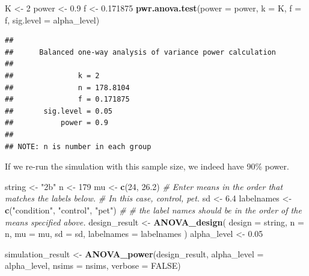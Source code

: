 \documentclass[]{book}
\newenvironment{Shaded}{\begin{snugshade}}{\end{snugshade}}
\newcommand{\CommentTok}[1]{\textcolor[rgb]{0.56,0.35,0.01}{\textit{#1}}}
\newcommand{\DataTypeTok}[1]{\textcolor[rgb]{0.13,0.29,0.53}{#1}}
\newcommand{\DecValTok}[1]{\textcolor[rgb]{0.00,0.00,0.81}{#1}}
\newcommand{\FloatTok}[1]{\textcolor[rgb]{0.00,0.00,0.81}{#1}}
\newcommand{\KeywordTok}[1]{\textcolor[rgb]{0.13,0.29,0.53}{\textbf{#1}}}
\newcommand{\NormalTok}[1]{#1}
\newcommand{\OtherTok}[1]{\textcolor[rgb]{0.56,0.35,0.01}{#1}}
\newcommand{\StringTok}[1]{\textcolor[rgb]{0.31,0.60,0.02}{#1}}
\begin{document}
\begin{Shaded}
\begin{Highlighting}[]
\NormalTok{K <-}\StringTok{ }\DecValTok{2}
\NormalTok{power <-}\StringTok{ }\FloatTok{0.9}
\NormalTok{f <-}\StringTok{ }\FloatTok{0.171875}
\KeywordTok{pwr.anova.test}\NormalTok{(}\DataTypeTok{power =}\NormalTok{ power,}
               \DataTypeTok{k =}\NormalTok{ K,}
               \DataTypeTok{f =}\NormalTok{ f,}
               \DataTypeTok{sig.level =}\NormalTok{ alpha_level)}
\end{Highlighting}
\end{Shaded}

\begin{verbatim}
## 
##      Balanced one-way analysis of variance power calculation 
## 
##               k = 2
##               n = 178.8104
##               f = 0.171875
##       sig.level = 0.05
##           power = 0.9
## 
## NOTE: n is number in each group
\end{verbatim}

If we re-run the simulation with this sample size, we indeed have 90\% power.

\begin{Shaded}
\begin{Highlighting}[]
\NormalTok{string <-}\StringTok{ "2b"}
\NormalTok{n <-}\StringTok{ }\DecValTok{179}
\NormalTok{mu <-}\StringTok{ }\KeywordTok{c}\NormalTok{(}\DecValTok{24}\NormalTok{, }\FloatTok{26.2}\NormalTok{)}
\CommentTok{# Enter means in the order that matches the labels below.}
\CommentTok{# In this case, control, pet.}
\NormalTok{sd <-}\StringTok{ }\FloatTok{6.4}
\NormalTok{labelnames <-}\StringTok{ }\KeywordTok{c}\NormalTok{(}\StringTok{"condition"}\NormalTok{, }\StringTok{"control"}\NormalTok{, }\StringTok{"pet"}\NormalTok{) }\CommentTok{#}
\CommentTok{# the label names should be in the order of the means specified above.}
\NormalTok{design_result <-}\StringTok{ }\KeywordTok{ANOVA_design}\NormalTok{(}
\DataTypeTok{design =}\NormalTok{ string,}
\DataTypeTok{n =}\NormalTok{ n,}
\DataTypeTok{mu =}\NormalTok{ mu,}
\DataTypeTok{sd =}\NormalTok{ sd,}
\DataTypeTok{labelnames =}\NormalTok{ labelnames}
\NormalTok{)}
\NormalTok{alpha_level <-}\StringTok{ }\FloatTok{0.05}
\end{Highlighting}
\end{Shaded}

\begin{Shaded}
\begin{Highlighting}[]
\NormalTok{simulation_result <-}\StringTok{ }\KeywordTok{ANOVA_power}\NormalTok{(design_result, }
                                 \DataTypeTok{alpha_level =}\NormalTok{ alpha_level, }
                                 \DataTypeTok{nsims =}\NormalTok{ nsims,}
                                 \DataTypeTok{verbose =} \OtherTok{FALSE}\NormalTok{)}
\end{Highlighting}
\end{Shaded}
\end{document}
